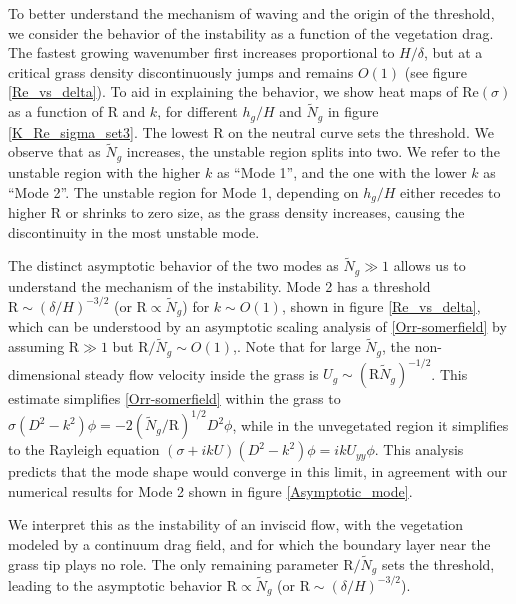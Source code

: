 \documentclass[aps,prl,reprint,twocolumn,showpacs,superscriptaddress,10pt]{revtex4-1}  %
\newcommand{\hg}{h_g}
\newcommand{\Rey}{\text{R}}
\newcommand{\Ndg}{\tilde{N}_g}
\begin{document}
To better understand the mechanism of waving and the origin of the threshold, we consider the behavior of the instability as a function of the vegetation drag.
The fastest growing wavenumber first increases proportional to $H/\delta$, but at a critical grass density discontinuously jumps and remains $O(1)$ (see figure \ref{Re_vs_delta}). 
To aid in explaining the behavior, we show heat maps of Re$(\sigma)$ as a function of $\Rey$ and $k$, for different $\hg/H$ and $\Ndg$ in figure \ref{K_Re_sigma_set3}. 
The lowest $\Rey$ on the neutral curve sets the threshold. 
We observe that as $\Ndg$ increases, the unstable region splits into two. We refer to the unstable region with the higher $k$ as ``Mode 1'', and the one with the lower $k$ as ``Mode 2''. 
The unstable region for Mode 1, depending on $\hg/H$ either recedes to higher $\Rey$ or shrinks to zero size, as the grass density increases, causing the discontinuity in the most unstable mode.

The distinct asymptotic behavior of the two modes as $\Ndg \gg 1$ allows us to understand the mechanism of the instability. 
Mode 2 has a threshold $\Rey \sim ({\delta}/{H})^{-3/2}$ (or $\Rey \propto \Ndg$) for $k\sim O(1)$, shown in figure \ref{Re_vs_delta}, which can be understood by an asymptotic scaling analysis of \eqref{Orr-somerfield} by assuming $\Rey \gg 1$ but $\Rey/\Ndg \sim O(1)$,.
Note that for large $\Ndg$, the non-dimensional steady flow velocity inside the grass is $U_g \sim (\Rey \Ndg)^{-1/2}$. 
This estimate simplifies \eqref{Orr-somerfield} within the grass to $\sigma\left(D^2-k^2\right)\phi = -2{(\Ndg/\Rey)^{1/2}}D^2\phi$, while in the unvegetated region it simplifies to the Rayleigh equation $ \left(\sigma+ikU\right) \left(D^2-k^2\right)\phi =  ikU_{yy}\phi$. 
This analysis predicts that the mode shape would converge in this limit, in agreement with our numerical results for Mode 2 shown in figure \ref{Asymptotic_mode}. 

We interpret this as the instability of an inviscid flow, with the vegetation modeled by a continuum drag field, and for which the boundary layer near the grass tip plays no role. The only remaining parameter $\Rey/\Ndg$ 
sets the threshold, leading to the asymptotic behavior $\Rey \propto \Ndg$ (or $\Rey \sim ({\delta}/{H})^{-3/2}$).
\end{document}
